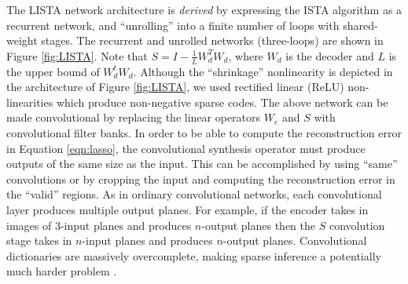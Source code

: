 The LISTA network architecture is \emph{derived} by expressing the ISTA
algorithm as a recurrent network, and ``unrolling'' into a finite number of
loops with shared-weight stages.  The recurrent and unrolled networks
(three-loops) are shown in Figure \ref{fig:LISTA}. Note that
$S=I-\frac{1}{L}W_d^T W_d$, where $W_d$ is the decoder and $L$ is the upper
bound of $W_d^t W_d$. Although the ``shrinkage'' nonlinearity is depicted in
the architecture of Figure \ref{fig:LISTA}, we used rectified linear (ReLU)
non-linearities which produce non-negative sparse codes.  The above network can
be made convolutional by replacing the linear operators $W_e$ and $S$ with
convolutional filter banks. In order to be able to compute the reconstruction
error in Equation \ref{eqn:lasso}, the convolutional synthesis operator must
produce outputs of the same size as the input. This can be accomplished by
using ``same'' convolutions or by cropping the input and computing the
reconstruction error in the ``valid'' regions. As in ordinary convolutional
networks, each convolutional layer produces multiple output planes. For
example, if the encoder takes in images of 3-input planes and produces
$n$-output planes then the $S$ convolution stage takes in $n$-input planes and
produces $n$-output planes. Convolutional dictionaries are massively
overcomplete, making sparse inference a potentially much harder problem
\cite{ConvSC}. 

